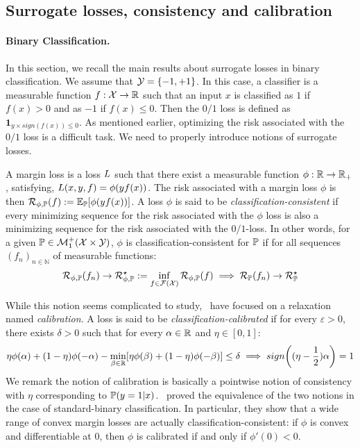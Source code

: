 \subsection{Surrogate losses, consistency and calibration} 

\paragraph{Binary Classification.} In this section, we recall the main results about surrogate losses in binary classification. We assume that $\mathcal{Y} = \{-1,+1\}$. In this case, a classifier is a measurable function $f:\mathcal{X}\to\mathbb{R}$ such that an input $x$ is classified as $1$ if $f(x)>0$ and as $-1$ if $f(x)\leq 0$. Then the $0/1$ loss is defined as $\mathbf{1}_{y\times sign(f(x))\leq0}$. As mentioned earlier, optimizing the risk associated with the $0/1$ loss is a difficult task. We need to properly introduce notions of surrogate losses. 

A margin loss is a loss $L$ such that there exist a measurable function $\phi:\mathbb{R}\to\mathbb{R}_+$, satisfying, $L(x,y,f) =\phi(yf(x))$. The risk associated with a margin loss $\phi$ is then $\risk_{\phi,\PP}(f):=\mathbb{E}_\PP\left[\phi(yf(x))\right]$. A loss $\phi$ is said to be \emph{classification-consistent} if every minimizing sequence for the risk associated with the $\phi$ loss is also a minimizing sequence for the risk associated with the $0/1$-loss. In other words, for a given $\mathbb{P}\in\mathcal{M}_1^+(\mathcal{X}\times\mathcal{Y})$, $\phi$ is classification-consistent for $\mathbb{P}$ if for all sequences $(f_n)_{n\in\mathbb{N}}$ of measurable functions:
\begin{align}
    \mathcal{R}_{\phi,\mathbb{P}}(f_n)\to \mathcal{R}_{\phi,\mathbb{P}}^\star:=\inf_{f\in\mathcal{F}(\mathcal{X})}\mathcal{R}_{\phi,\mathbb{P}}(f)\implies\mathcal{R}_{\mathbb{P}}(f_n)\to \mathcal{R}_{\mathbb{P}}^\star
\end{align}

 While this notion seems complicated to study,~\cite{zhang2004statistical,bartlett2006convexity,steinwart2007compare} have focused on a relaxation named \emph{calibration}. A loss is said to be \emph{classification-calibrated} if for every $\varepsilon>0$, there exists $\delta>0$ such that for every $\alpha\in\mathbb{R}$ and $\eta\in[0,1]$:
\begin{align*}
    \eta\phi(\alpha)+(1-\eta)\phi(-\alpha)-\min_{\beta\in\RR}\left[ \eta\phi(\beta)+(1-\eta)\phi(-\beta)\right]\leq \delta\implies sign\left((\eta-\frac12)\alpha\right)=1
\end{align*}
We remark the notion of calibration is basically a pointwise notion of consistency with $\eta$ corresponding to $\mathbb{P}(y=1|x)$.~\citet{zhang2004statistical,bartlett2006convexity,steinwart2007compare} proved the equivalence of the two notions in the case of standard-binary classification. In particular, they show that a wide range of convex margin losses are actually classification-consistent: if $\phi$ is convex and differentiable at $0$, then $\phi$ is calibrated if and only if $\phi'(0)<0$.



